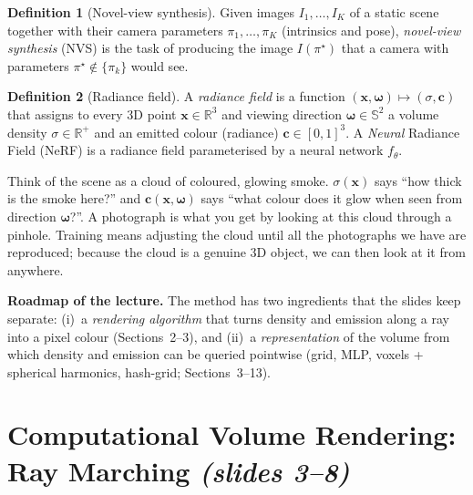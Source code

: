 \documentclass[11pt,a4paper]{article}
\newcommand{\sref}[1]{\texorpdfstring{\emph{(slides #1)}}{(slides #1)}}
\newcommand{\R}{\mathbb{R}}
\newcommand{\om}{\boldsymbol{\omega}}
\newcommand{\cc}{\boldsymbol{c}}
\newcommand{\xx}{\boldsymbol{x}}
\theoremstyle{definition}
\newtheorem{definition}{Definition}[section]
\theoremstyle{plain}
\theoremstyle{remark}
\begin{document}

\begin{definition}[Novel-view synthesis]
Given images $I_1,\dots,I_K$ of a static scene together with their camera parameters $\pi_1,\dots,\pi_K$ (intrinsics and pose), \emph{novel-view synthesis} (NVS) is the task of producing the image $I(\pi^\star)$ that a camera with parameters $\pi^\star\notin\{\pi_k\}$ would see.
\end{definition}

\begin{definition}[Radiance field]
A \emph{radiance field} is a function $(\xx,\om)\mapsto(\sigma,\cc)$ that assigns to every 3D point $\xx\in\R^3$ and viewing direction $\om\in\mathbb{S}^2$ a volume density $\sigma\in\R^+$ and an emitted colour (radiance) $\cc\in[0,1]^3$. A \emph{Neural} Radiance Field (NeRF) is a radiance field parameterised by a neural network $f_\theta$.
\end{definition}

\begin{intuition}
Think of the scene as a cloud of coloured, glowing smoke. $\sigma(\xx)$ says ``how thick is the smoke here?'' and $\cc(\xx,\om)$ says ``what colour does it glow when seen from direction $\om$?''. A photograph is what you get by looking at this cloud through a pinhole. Training means adjusting the cloud until all the photographs we have are reproduced; because the cloud is a genuine 3D object, we can then look at it from anywhere.
\end{intuition}

\textbf{Roadmap of the lecture.} The method has two ingredients that the slides keep separate:
(i)~a \emph{rendering algorithm} that turns density and emission along a ray into a pixel colour (Sections~2--3), and (ii)~a \emph{representation} of the volume from which density and emission can be queried pointwise (grid, MLP, voxels + spherical harmonics, hash-grid; Sections~3--13).

\section{Computational Volume Rendering: Ray Marching \sref{3--8}}
\end{document}
